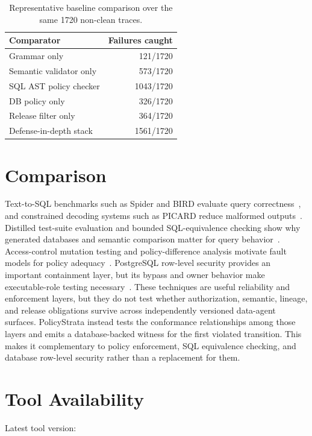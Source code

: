 \documentclass[sigconf]{acmart}
\begin{document}
\begin{table}[t]
\caption{Representative baseline comparison over the same 1720 non-clean traces.}
\label{tab:baselines}
\begin{tabular}{lr}
\toprule
Comparator & Failures caught \\
\midrule
Grammar only & 121/1720 \\
Semantic validator only & 573/1720 \\
SQL AST policy checker & 1043/1720 \\
DB policy only & 326/1720 \\
Release filter only & 364/1720 \\
Defense-in-depth stack & 1561/1720 \\
\bottomrule
\end{tabular}
\end{table}

\section{Comparison}

Text-to-SQL benchmarks such as Spider and BIRD evaluate query correctness~\cite{spider,bird}, and constrained decoding systems such as PICARD reduce malformed outputs~\cite{picard}. Distilled test-suite evaluation and bounded SQL-equivalence checking show why generated databases and semantic comparison matter for query behavior~\cite{test_suite_accuracy,verieql}. Access-control mutation testing and policy-difference analysis motivate fault models for policy adequacy~\cite{xacml_mutation,margrave}. PostgreSQL row-level security provides an important containment layer, but its bypass and owner behavior make executable-role testing necessary~\cite{postgresql_rls}. These techniques are useful reliability and enforcement layers, but they do not test whether authorization, semantic, lineage, and release obligations survive across independently versioned data-agent surfaces. PolicyStrata instead tests the conformance relationships among those layers and emits a database-backed witness for the first violated transition. This makes it complementary to policy enforcement, SQL equivalence checking, and database row-level security rather than a replacement for them.

\section{Tool Availability}

Latest tool version:
\end{document}
